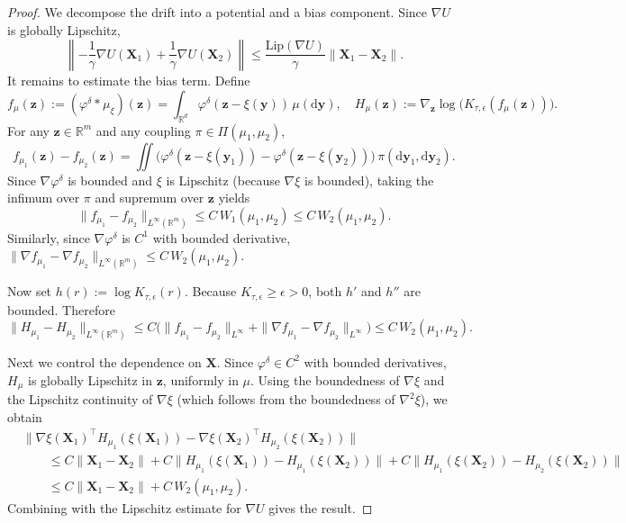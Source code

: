 \documentclass[10pt,a4paper]{amsart}
\def\bX{\mathbf{X}}
\def\by{\mathbf{y}}
\def\bz{\mathbf{z}}
\def\intd{\mathrm{d}}
\begin{document}
\begin{proof}
We decompose the drift into a potential and a bias component. Since $\nabla U$ is globally Lipschitz,
\[
\left\|-\frac1\gamma \nabla U(\bX_1)+\frac1\gamma \nabla U(\bX_2)\right\|
\le
\frac{\mathrm{Lip}(\nabla U)}{\gamma}\|\bX_1-\bX_2\|.
\]
It remains to estimate the bias term. Define
\[
f_\mu(\bz):=(\varphi^\delta * \mu_{\xi})(\bz)
=
\int_{\mathbb R^{d}} \varphi^\delta(\bz-\xi(\by))\,\mu(\intd \by),
\quad
H_\mu(\bz):=\nabla_\bz \log\!\big(K_{\tau,\epsilon}(f_\mu(\bz))\big).
\]
For any $\bz\in\mathbb R^m$ and any coupling $\pi\in\Pi(\mu_1,\mu_2)$,
\[
f_{\mu_1}(\bz)-f_{\mu_2}(\bz)
=
\iint
\Big(
\varphi^\delta(\bz-\xi(\by_1))
-
\varphi^\delta(\bz-\xi(\by_2))
\Big)\,\pi(\intd \by_1,\intd \by_2).
\]
Since $\nabla \varphi^\delta$ is bounded and $\xi$ is Lipschitz (because $\nabla \xi$ is bounded), taking the infimum over $\pi$ and supremum over $\bz$ yields
\[
\|f_{\mu_1}-f_{\mu_2}\|_{L^\infty(\mathbb R^m)}
\le
C\,W_1(\mu_1,\mu_2)
\le
C\,W_2(\mu_1,\mu_2).
\]
Similarly, since $\nabla \varphi^\delta$ is $C^1$ with bounded derivative,
$\|\nabla f_{\mu_1}-\nabla f_{\mu_2}\|_{L^\infty(\mathbb R^m)}
\le
C\,W_2(\mu_1,\mu_2)$.

Now set $h(r):=\log K_{\tau,\epsilon}(r)$.
Because $K_{\tau,\epsilon}\ge \epsilon>0$, both $h'$ and $h''$ are bounded. Therefore
\[
\|H_{\mu_1}-H_{\mu_2}\|_{L^\infty(\mathbb R^m)}
\le
C\Big(
\|f_{\mu_1}-f_{\mu_2}\|_{L^\infty}
+
\|\nabla f_{\mu_1}-\nabla f_{\mu_2}\|_{L^\infty}
\Big)
\le
C\,W_2(\mu_1,\mu_2).
\]

Next we control the dependence on $\bX$. Since $\varphi^\delta\in C^2$ with bounded derivatives, $H_\mu$ is globally Lipschitz in $\bz$, uniformly in $\mu$.
Using the boundedness of $\nabla \xi$ and the Lipschitz continuity of $\nabla \xi$ (which follows from the boundedness of $\nabla^2 \xi$), we obtain
\begin{align*}
&\|\nabla \xi(\bX_1)^\top H_{\mu_1}(\xi(\bX_1))
-
\nabla \xi(\bX_2)^\top H_{\mu_2}(\xi(\bX_2))\| \\
&\qquad \le
C\|\bX_1-\bX_2\|
+
C\|H_{\mu_1}(\xi(\bX_1))-H_{\mu_1}(\xi(\bX_2))\|
+
C\|H_{\mu_1}(\xi(\bX_2))-H_{\mu_2}(\xi(\bX_2))\| \\
&\qquad \le
C\|\bX_1-\bX_2\|+C\,W_2(\mu_1,\mu_2).
\end{align*}
Combining with the Lipschitz estimate for $\nabla U$ gives the result.
\end{proof}
\end{document}
